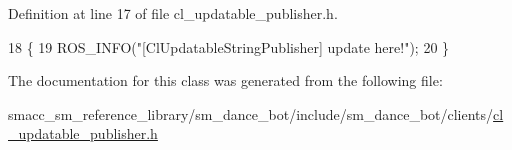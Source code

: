 Definition at line 17 of file cl\+\_\+updatable\+\_\+publisher.\+h.


\begin{DoxyCode}
18     \{
19         ROS\_INFO(\textcolor{stringliteral}{"[ClUpdatableStringPublisher] update here!"});
20     \}
\end{DoxyCode}


The documentation for this class was generated from the following file\+:\begin{DoxyCompactItemize}
\item 
smacc\+\_\+sm\+\_\+reference\+\_\+library/sm\+\_\+dance\+\_\+bot/include/sm\+\_\+dance\+\_\+bot/clients/\hyperlink{cl__updatable__publisher_8h}{cl\+\_\+updatable\+\_\+publisher.\+h}\end{DoxyCompactItemize}

